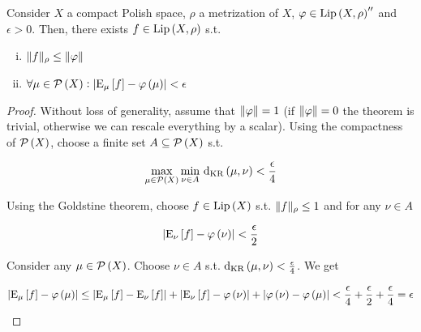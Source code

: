 \begin{samepage}
\begin{lemma}
\label{lmm:double_dual}

Consider $X$ a compact Polish space, $\rho$ a metrization of $X$, $\varphi \in {\operatorname{Lip}}\left(X,\rho\right)''$ and $\epsilon > 0$. Then, there exists $f \in {\operatorname{Lip}}\left(X,\rho\right)$ s.t.

\begin{enumerate}[i.]

\item $\lVert f \rVert_\rho \leq \lVert \varphi \rVert$
\item $\forall \mu \in \mathcal{P}\left(X\right): \lvert \operatorname{E}_\mu\left[f\right] - \varphi\left(\mu\right) \rvert < \epsilon$

\end{enumerate}

\end{lemma}
\end{samepage}

\begin{proof}

Without loss of generality, assume that $\lVert \varphi \rVert=1$ (if $\lVert \varphi \rVert=0$ the theorem is trivial, otherwise we can rescale everything by a scalar). Using the compactness of $\mathcal{P}\left(X\right)$, choose a finite set $A \subseteq \mathcal{P}\left(X\right)$ s.t. 

$$\max_{\mu \in \mathcal{P}\left(X\right)} \min_{\nu \in A}\, \operatorname{d}_{\textnormal{KR}}\left(\mu,\nu\right) < \frac{\epsilon}{4}$$

Using the Goldstine theorem, choose $f \in {\operatorname{Lip}}\left(X\right)$ s.t. $\lVert f \rVert_\rho \leq 1$ and for any $\nu \in A$ 

$$\lvert \operatorname{E}_\nu\left[f\right] - \varphi\left(\nu\right) \rvert < \frac{\epsilon}{2}$$

Consider any $\mu \in \mathcal{P}\left(X\right)$. Choose $\nu \in A$ s.t. $\operatorname{d}_{\textnormal{KR}}\left(\mu,\nu\right) < \frac{\epsilon}{4}$. We get

$$\lvert \operatorname{E}_\mu\left[f\right] - \varphi\left(\mu\right) \rvert \leq \lvert \operatorname{E}_\mu\left[f\right] - \operatorname{E}_\nu\left[f\right] \rvert + \lvert \operatorname{E}_\nu\left[f\right] - \varphi\left(\nu\right) \rvert + \lvert \varphi\left(\nu\right) - \varphi\left(\mu\right) \rvert < \frac{\epsilon}{4} + \frac{\epsilon}{2} + \frac{\epsilon}{4} = \epsilon$$
\end{proof}

